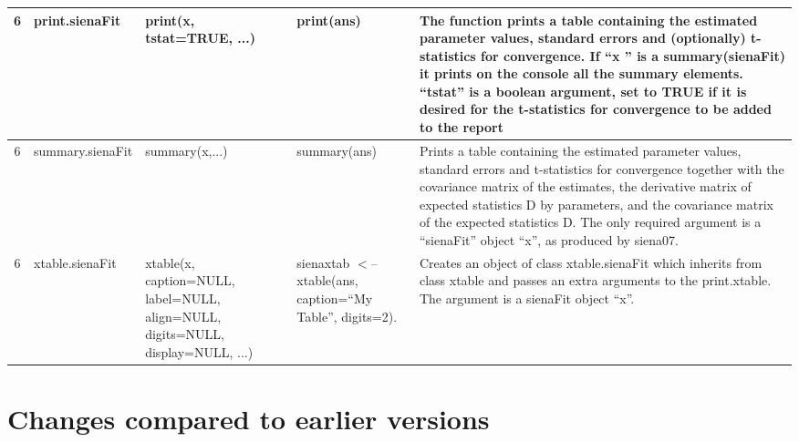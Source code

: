 \documentclass[a4paper,fleqn]{article}
\newcommand{\+}{\, + \,}
\begin{document}
{\begin{landscape}
\begin{longtable}{c | p{3cm} | p{5.2cm} | p{4.2cm} | p{8.5cm} }
6 & print.sienaFit & print(x, tstat=TRUE, ...) & print(ans) & The function
prints a table containing the estimated parameter values, standard errors and
(optionally) t-statistics for convergence. If ``x '' is a summary(sienaFit) it
prints on the console all the summary elements. ``tstat'' is a boolean
argument, set to TRUE if it is desired for the t-statistics for convergence to
be added to the report\\
\hline

6 & summary.sienaFit & summary(x,...) & summary(ans) & Prints a table
containing the estimated parameter values, standard errors and t-statistics for
convergence together with the covariance matrix of the estimates, the
derivative matrix of expected statistics D by parameters, and the covariance
matrix of the expected statistics D.  The only required argument is a
``sienaFit'' object ``x'', as produced by  siena07.\\
\hline

6 & xtable.sienaFit & xtable(x, caption=NULL, \newline
label=NULL, align=NULL, \newline
digits=NULL,\newline
 display=NULL, ...) & sienaxtab $<$-- \newline
 xtable(ans, \newline
caption=``My
Table'', \newline
digits=2).  &Creates an object of class xtable.sienaFit which inherits
from class xtable and passes an extra arguments to the print.xtable.
The argument is a sienaFit object ``x''. \\
\hline


\end{longtable}
\end{landscape}


%



\section{Changes compared to earlier versions}

}
\end{document}

